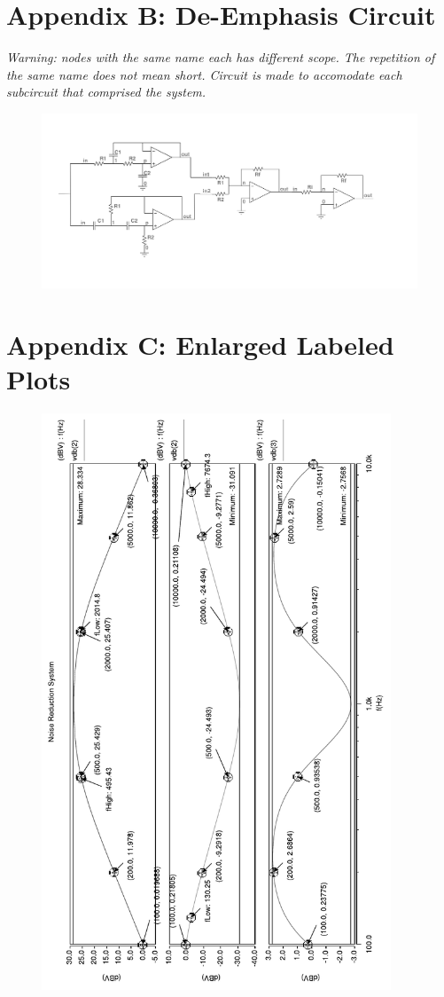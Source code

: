 \documentclass[a4paper]{IEEEtran}
\begin{document}
		\section*{Appendix B: De-Emphasis Circuit}
		\it{Warning: nodes with the same name each has different scope. The repetition of the same name does not mean short. Circuit is made to accomodate each subcircuit that comprised the system.}
			\begin{figure}[h!]
				\begin{center}
					\includegraphics[width=\textwidth]{deemp.jpg}
				\end{center}
			\end{figure}
		\newpage
		\section*{Appendix C: Enlarged Labeled Plots}
			\begin{figure}[h!]
				\begin{center}
					\includegraphics[width=\textwidth,height=650px]{nrs_whole}
				\end{center}
			\end{figure}
\end{document}
